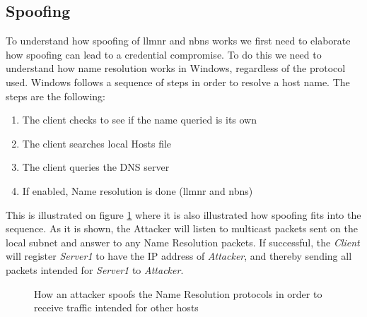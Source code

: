\documentclass{article}
\begin{document}
\subsection{Spoofing}
\label{sec:spoofing}
To understand how spoofing of \gls{llmnr} and \gls{nbns} works we first need to elaborate how spoofing can lead to a credential compromise. To do this we need to understand how name resolution works in Windows, regardless of the protocol used. Windows follows a sequence of steps in order to resolve a host name.\cite{url:microsoft:name-resolution-order} The steps are the following:
\begin{enumerate}
	\item The client checks to see if the name queried is its own
	\item The client searches local Hosts file
	\item The client queries the DNS server
	\item If enabled, Name resolution is done (\gls{llmnr} and \gls{nbns})
\end{enumerate}

This is illustrated on figure \ref{fig:host-resolution-sequence-and-spoofing} where it is also illustrated how spoofing fits into the sequence. As it is shown, the Attacker will listen to multicast packets sent on the local subnet and answer to any Name Resolution packets. If successful, the \emph{Client} will register \emph{Server1} to have the IP address of \emph{Attacker}, and thereby sending all packets intended for \emph{Server1} to \emph{Attacker}.

\begin{figure}[!ht]
	\centering
	\caption{How an attacker spoofs the Name Resolution protocols in order to receive traffic intended for other hosts}
	\label{fig:host-resolution-sequence-and-spoofing}
\end{figure}
\end{document}

